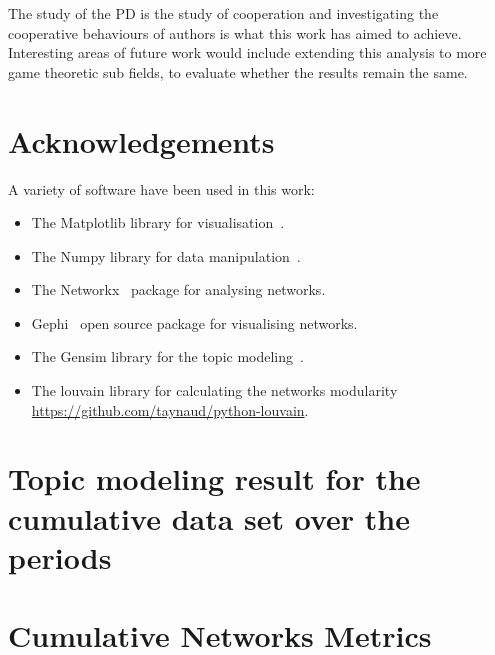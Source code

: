 \documentclass{article}
\theoremstyle{definition}
\begin{document}
The study of the PD is the study of cooperation and investigating
the cooperative behaviours of authors is what this work has aimed to achieve.
Interesting areas of future work would include extending this analysis to more
game theoretic sub fields, to evaluate whether the results remain the same.

\section{Acknowledgements}

A variety of software have been used in this work:

\begin{itemize}
    \item The Matplotlib library for visualisation~\cite{hunter2007matplotlib}.
    \item The Numpy library for data manipulation~\cite{walt2011numpy}.
    \item The Networkx~\cite{networkx} package for analysing networks.
    \item Gephi~\cite{ICWSM09154} open source package for visualising networks.
    \item The Gensim library for the topic modeling~\cite{rehurek_lrec}.
    \item The louvain library for calculating the networks modularity \url{https://github.com/taynaud/python-louvain}.
\end{itemize}




\appendix

\section{Topic modeling result for the cumulative data set over the periods}\label{appendix:topics_per_year}

\begin{table}[!hbtp]
    \begin{center}
    \resizebox{\textwidth}{!}{
    }
    \end{center}
\end{table}

\section{Cumulative Networks Metrics}\label{appendix:tables}
\end{document}
